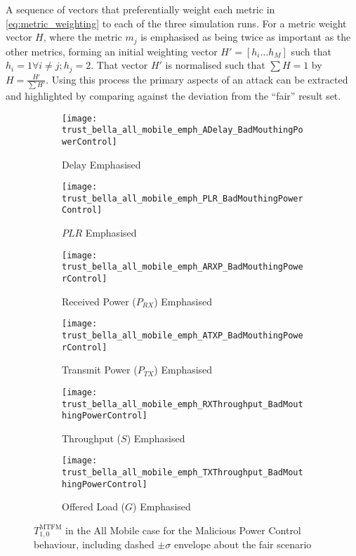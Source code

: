 A sequence of vectors that preferentially weight each metric in \autoref{eq:metric_weighting} to each of the three simulation runs.
For a metric weight vector $H$, where the metric $m_j$ is emphasised as being twice as important as the other metrics, forming an initial weighting vector $H'=[h_i\dots h_M]$ such that $h_i = 1 \forall i \ne j; h_j=2$.
That vector $H'$ is normalised such that $\sum H = 1$ by $H= \frac{H'}{\sum H'}$.
Using this process the primary aspects of an attack can be extracted and highlighted by comparing against the deviation from the ``fair'' result set. 

\begin{figure}[h]
	\centering
	\begin{subfigure}{0.45\textwidth}
		\texttt{[image: trust\_bella\_all\_mobile\_emph\_ADelay\_BadMouthingPowerControl]} 
		\caption{$\text{Delay}$ Emphasised}
		\label{fig:all_mobile_badmouthing_delay}
	\end{subfigure}
	\begin{subfigure}{0.45\textwidth}
		\texttt{[image: trust\_bella\_all\_mobile\_emph\_PLR\_BadMouthingPowerControl]} 
		\caption{$PLR$ Emphasised}
		\label{fig:all_mobile_badmouthing_plr}
	\end{subfigure}
	
	\begin{subfigure}{0.45\textwidth}
		\texttt{[image: trust\_bella\_all\_mobile\_emph\_ARXP\_BadMouthingPowerControl]} 
		\caption{Received Power ($P_{RX}$) Emphasised}
		\label{fig:all_mobile_badmouthing_rxp}
	\end{subfigure}	
	\begin{subfigure}{0.45\textwidth}
		\texttt{[image: trust\_bella\_all\_mobile\_emph\_ATXP\_BadMouthingPowerControl]} 
		\caption{Transmit Power ($P_{TX}$) Emphasised}
		\label{fig:all_mobile_badmouthing_txp}
	\end{subfigure}
	
	\begin{subfigure}{0.45\textwidth}
		\texttt{[image: trust\_bella\_all\_mobile\_emph\_RXThroughput\_BadMouthingPowerControl]} 
		\caption{Throughput ($S$) Emphasised}
		\label{fig:all_mobile_badmouthing_rxthroughput}
	\end{subfigure}
	\begin{subfigure}{0.45\textwidth}
		\texttt{[image: trust\_bella\_all\_mobile\_emph\_TXThroughput\_BadMouthingPowerControl]} 
		\caption{Offered Load ($G$) Emphasised}
		\label{fig:all_mobile_badmouthing_txthroughput}
	\end{subfigure}
	\caption{$T_{1,0}^\text{MTFM}$ in the All Mobile case for the Malicious Power Control behaviour, including dashed $\pm\sigma$ envelope about the fair scenario}
	\label{fig:all_mobile_badmouthing}
\end{figure}
